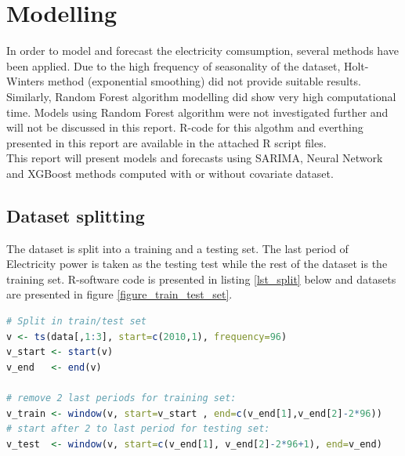 \section{Modelling}
In order to model and forecast the electricity comsumption, several methods have been applied. 
Due to the high frequency of seasonality of the dataset, Holt-Winters method (exponential smoothing) 
did not provide suitable results. Similarly, Random Forest algorithm modelling did show very high 
computational time. Models using Random Forest algorithm were not investigated further and will not 
be discussed in this report. R-code for this algothm and everthing presented in this report are 
available in the attached R script files.\\

This report will present models and forecasts using SARIMA, Neural Network and XGBoost methods 
computed with or without covariate dataset.

\subsection{Dataset splitting}

The dataset is split into a training and a testing set. The last period of Electricity power is 
taken as the testing test while the rest of the dataset is the training set. R-software code is 
presented in listing \ref{lst_split} below and datasets are presented in figure 
\ref{figure_train_test_set}. 

\begin{lstlisting}[language=R, caption={Dataset splitting into train/test sets}, captionpos=b, label={lst_split}]
# Split in train/test set
v <- ts(data[,1:3], start=c(2010,1), frequency=96)
v_start <- start(v)
v_end   <- end(v)

# remove 2 last periods for training set:
v_train <- window(v, start=v_start , end=c(v_end[1],v_end[2]-2*96))
# start after 2 to last period for testing set:
v_test  <- window(v, start=c(v_end[1], v_end[2]-2*96+1), end=v_end)
\end{lstlisting}


